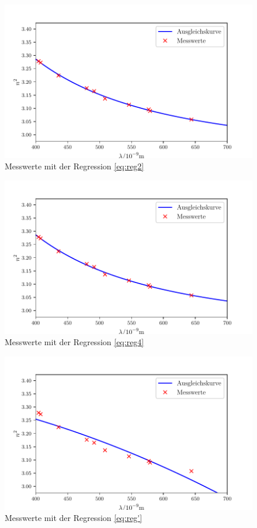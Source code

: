 \begin{figure}
\centering
\includegraphics[width=\linewidth-70pt,height=\textheight-70pt,keepaspectratio]{content/images/Graph11.pdf}
\caption{Messwerte mit der Regression \eqref{eq:reg2}}
\label{fig:reg2}
\end{figure}

\begin{figure}
\centering
\includegraphics[width=\linewidth-70pt,height=\textheight-70pt,keepaspectratio]{content/images/Graph11.4.pdf}
\caption{Messwerte mit der Regression \eqref{eq:reg4}}
\end{figure}

\begin{figure}
\centering
\includegraphics[width=\linewidth-70pt,height=\textheight-70pt,keepaspectratio]{content/images/Graph11a.pdf}
\caption{Messwerte mit der Regression \eqref{eq:reg'}}
\label{fig:reg'}
\end{figure}

